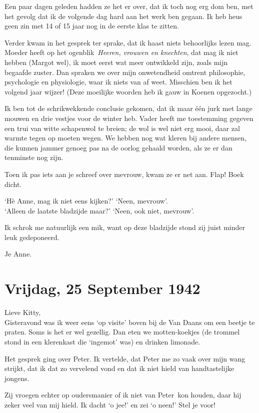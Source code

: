 \documentclass{book}
\begin{document}
Een paar dagen geleden hadden ze het er over, dat ik toch nog erg dom ben, met
het gevolg dat ik de volgende dag hard aan het werk ben gegaan.  Ik heb heus
geen zin met 14 of 15 jaar nog in de eerste klas te zitten.

Verder kwam in het gesprek ter sprake, dat ik haast niets behoorlijks lezen mag.
Moeder heeft op het ogenblik~\emph{Heeren, vrouwen en knechten}, dat mag ik niet
hebben (Margot wel), ik moet eerst wat meer ontwikkeld zijn, zoals mijn begaafde
zuster. Dan spraken we over mijn onwetendheid omtrent philosophie, psychologie
en physiologie, waar ik niets van af weet. Misschien ben ik het volgend jaar
wijzer! (Deze moeilijke woorden heb ik gauw in Koenen opgezocht.)

Ik ben tot de schrikwekkende conclusie gekomen, dat ik maar één jurk met lange
mouwen en drie vestjes voor de winter heb. Vader heeft me toestemming gegeven
een trui van witte schapenwol te breien; de wol is wel niet erg mooi, daar zal
warmte tegen op moeten wegen. We hebben nog wat kleren bij andere mensen, die
kunnen jammer genoeg pas na de oorlog gehaald worden, als ze er dan tenminste
nog zijn.

Toen ik pas iets aan je schreef over mevrouw, kwam ze er net aan. Flap!  Boek
dicht.

`Hè Anne, mag ik niet eens kijken?' `Neen, mevrouw'.\\
`Alleen de laatste
bladzijde maar?' `Neen, ook niet, mevrouw'.

Ik schrok me natuurlijk een mik, want op deze bladzijde stond zij juist minder
leuk gedeponeerd.

Je Anne.

\section*{Vrijdag, 25 September 1942}

Lieve Kitty,\\
Gisteravond was ik weer eens `op visite' boven bij de Van Daans
om een beetje te praten. Soms is het er wel gezellig. Dan eten we motten-koekjes
(de trommel stond in een klerenkast die `ingemot' was) en drinken limonade.

Het gesprek ging over Peter. Ik vertelde, dat Peter me zo vaak over mijn wang
strijkt, dat ik dat zo vervelend vond en dat ik niet hield van handtastelijke
jongens.

Zij vroegen echter op oudersmanier of ik niet van Peter~kon houden, daar hij
zeker veel van mij hield. Ik dacht `o jee!' en zei `o neen!' Stel je voor!
\end{document}
